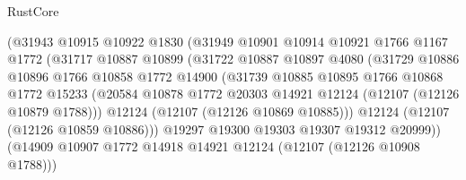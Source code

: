 \begin{lexlean}{RustCore}
\begin{coremodule}
                              (@31943
                                @10915
                                @10922
                                @1830
                                (@31949
                                  @10901
                                  @10914
                                  @10921
                                  @1766
                                  @1167
                                  @1772
                                  (@31717
                                    @10887
                                    @10899
                                    (@31722
                                      @10887
                                      @10897
                                      @4080
                                      (@31729
                                        @10886
                                        @10896
                                        @1766
                                        @10858
                                        @1772
                                        @14900
                                        (@31739
                                          @10885
                                          @10895
                                          @1766
                                          @10868
                                          @1772
                                          @15233
                                          (@20584
                                            @10878
                                            @1772
                                            @20303
                                            @14921
                                            @12124
                                            (@12107 (@12126 @10879 @1788)))
                                          @12124
                                          (@12107 (@12126 @10869 @10885)))
                                        @12124
                                        (@12107 (@12126 @10859 @10886)))
                                      @19297
                                      @19300
                                      @19303
                                      @19307
                                      @19312
                                      @20999))
                                  (@14909
                                    @10907
                                    @1772
                                    @14918
                                    @14921
                                    @12124
                                    (@12107 (@12126 @10908 @1788)))

\end{coremodule}
\end{lexlean}
